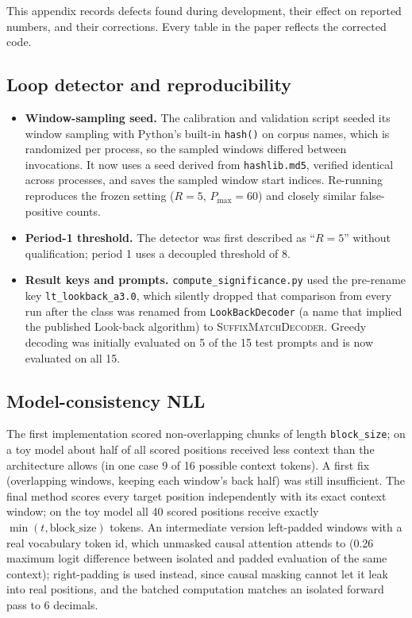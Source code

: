 \documentclass[make,article,submit,pdftex]{Definitions/mdpi}
\begin{document}
This appendix records defects found during development, their effect on reported numbers, and their corrections. Every table in the paper reflects the corrected code.

\subsection*{Loop detector and reproducibility}
\begin{itemize}[leftmargin=*]
  \item \textbf{Window-sampling seed.} The calibration and validation script seeded its window sampling with Python's built-in \texttt{hash()} on corpus names, which is randomized per process, so the sampled windows differed between invocations. It now uses a seed derived from \texttt{hashlib.md5}, verified identical across processes, and saves the sampled window start indices. Re-running reproduces the frozen setting ($R{=}5$, $P_{\max}{=}60$) and closely similar false-positive counts.
  \item \textbf{Period-1 threshold.} The detector was first described as ``$R{=}5$'' without qualification; period 1 uses a decoupled threshold of 8.
  \item \textbf{Result keys and prompts.} \texttt{compute\_\allowbreak{}significance.py} used the pre-rename key \texttt{lt\_lookback\_a3.0}, which silently dropped that comparison from every run after the class was renamed from \texttt{LookBackDecoder} (a name that implied the published Look-back algorithm) to \textsc{SuffixMatchDecoder}. Greedy decoding was initially evaluated on 5 of the 15 test prompts and is now evaluated on all 15.
\end{itemize}

\subsection*{Model-consistency NLL}
The first implementation scored non-overlapping chunks of length \texttt{block\_\allowbreak{}size}; on a toy model about half of all scored positions received less context than the architecture allows (in one case 9 of 16 possible context tokens). A first fix (overlapping windows, keeping each window's back half) was still insufficient. The final method scores every target position independently with its exact context window; on the toy model all 40 scored positions receive exactly $\min(t,\text{block\_size})$ tokens. An intermediate version left-padded windows with a real vocabulary token id, which unmasked causal attention attends to (0.26 maximum logit difference between isolated and padded evaluation of the same context); right-padding is used instead, since causal masking cannot let it leak into real positions, and the batched computation matches an isolated forward pass to 6 decimals.
\end{document}
